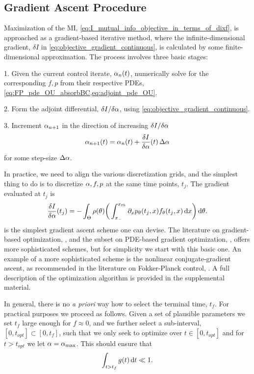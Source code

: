 \documentclass[12pt]{article}
\def \tf {{t_f}}
\def \topt {{ t_{opt}}}
\begin{document}
\subsection{Gradient Ascent Procedure}
\label{sec:gradient_ascent}
Maximization of the MI,
\cref{eq:I_mutual_info_objective_in_terms_of_dixf}, is approached as a
gradient-based iterative method, where the 
infinite-dimensional gradient, $\delta I$ in
\cref{eq:objective_gradient_continuous}, is calculated by some finite-dimensional
approximation. 
The process involves three basic stages:

1. Given the current control iterate, ${\alpha}_n(t)$, numerically solve for the
  corresponding $f,p$ from their respective PDEs,
  \cref{eq:FP_pde_OU_absorbBC,eq:adjoint_pde_OU}.

2. Form the adjoint differential,
  $\delta I / \delta {\alpha}$, using
  \cref{eq:objective_gradient_continuous}.

3. Increment ${\alpha}_{n+1}$ in the direction of increasing $\delta I / \delta
  {\alpha}$
  \begin{equation}
{\alpha}_{n+1}(t) = {\alpha}_n(t) + \frac {\delta I }{\delta {\alpha}} (t) \, \Delta {\alpha}
\label{eq:simple_gradient_ascent_increment}
\end{equation}
for some step-size $\Delta {\alpha}$.

In practice, we need to align the various discretization grids, and the simplest
thing to do is to discretize ${\alpha},f,p$ at the same time points, $t_j$.
The gradient evaluated at $t_j$ is $$ 
\frac {\delta I }{\delta {\alpha}}(t_j) =   
	-\int_\Theta  \rho({\theta})  \bigg(  
	\int_{ x_{-} }^{{ x_{th} }} {\partial}_x p_{\theta}(t_j,x) f_{\theta}(t_j,x) \, \mathrm{d} x    
	    \bigg) \, \mathrm{d} {\theta}.
$$
 is the simplest gradient ascent
scheme one can devise. The literature on gradient-based optimization,
\cite{Nocedal1999}, and the subset on PDE-based gradient optimization,
\cite{Borzi2012}, offers more sophisticated schemes, but for simplicity
we start with this basic one. An example of a more sophisticated scheme
is the nonlinear conjugate-gradient ascent, as recommended in the literature on
Fokker-Planck control, \cite{Annunziato2013}.
 A full description of the optimization algorithm is provided in the
 supplemental material. 

In general, there is no {\sl a priori} way how to select the terminal
time, $\tf$. 
For practical purposes we proceed as follows. Given a set of plausible
parameters we set $\tf$ large enough for $f\approx 0$, and we further select a sub-interval,
$[0, \topt] \subset [0, \tf]$, such that we only seek to optimize over $t\in
[0, \topt]$ and for $t > \topt$ we let ${\alpha}= { {\alpha}_{\textrm{max}} }$. This should ensure
that $$\int_{t>\tf} g(t) \intd{t} 
\ll 1.$$
\end{document}
